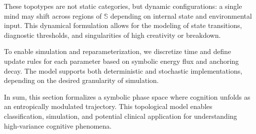 These topotypes are not static categories, but dynamic configurations: a single mind may shift across regions of $\mathbb{S}$ depending on internal state and environmental input. This dynamical formulation allows for the modeling of state transitions, diagnostic thresholds, and singularities of high creativity or breakdown.

To enable simulation and reparameterization, we discretize time and define update rules for each parameter based on symbolic energy flux and anchoring decay. The model supports both deterministic and stochastic implementations, depending on the desired granularity of simulation.

In sum, this section formalizes a symbolic phase space where cognition unfolds as an entropically modulated trajectory. This topological model enables classification, simulation, and potential clinical application for understanding high-variance cognitive phenomena.